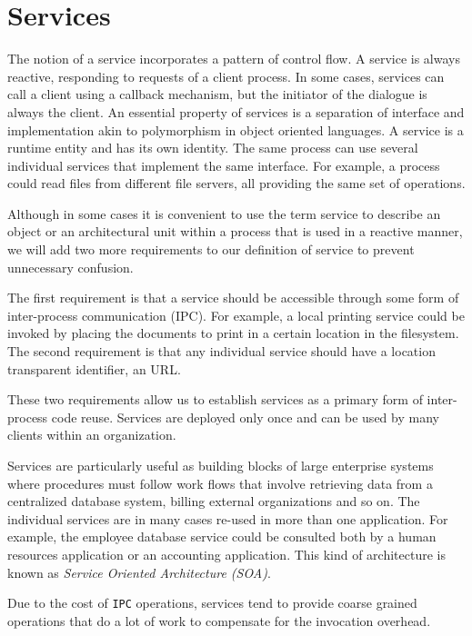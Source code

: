 \section{Services}
\label{sec:services}

The notion of a service incorporates a pattern of control flow. A service is always reactive, responding to requests of a client process. In some cases,
services can call a client using a callback mechanism, but the initiator of the dialogue is always the client. An essential property of services is a
separation of interface and implementation akin to polymorphism in object oriented languages. A service is a runtime entity and has its own identity.
The same process can use several individual services that implement the same interface. For example, a process could read files from different file
servers, all providing the same set of operations.

Although in some cases it is convenient to use the term service to describe an object or an architectural unit within a process that is used in
a reactive manner, we will add two more requirements to our definition of service to prevent unnecessary confusion.

The first requirement is that a service should be accessible through some form of inter-process communication (IPC). For example, a local printing service
could be invoked by placing the documents to print in a certain location in the filesystem. The second requirement is that any individual service
should have a location transparent identifier, an URL.

These two requirements allow us to establish services as a primary form of inter-process code reuse. Services are deployed only once and can be used
by many clients within an organization.

Services are particularly useful as building blocks of large enterprise systems where procedures must follow work flows that involve retrieving data
from a centralized database system, billing external organizations and so on. The individual services are in many cases re-used in more than one
application. For example, the employee database service could be consulted both by a human resources application or an accounting application.
This kind of architecture is known as \emph{Service Oriented Architecture (SOA)}.

Due to the cost of \texttt{IPC} operations, services tend to provide coarse grained operations that do a lot of work to compensate for the invocation
overhead.

